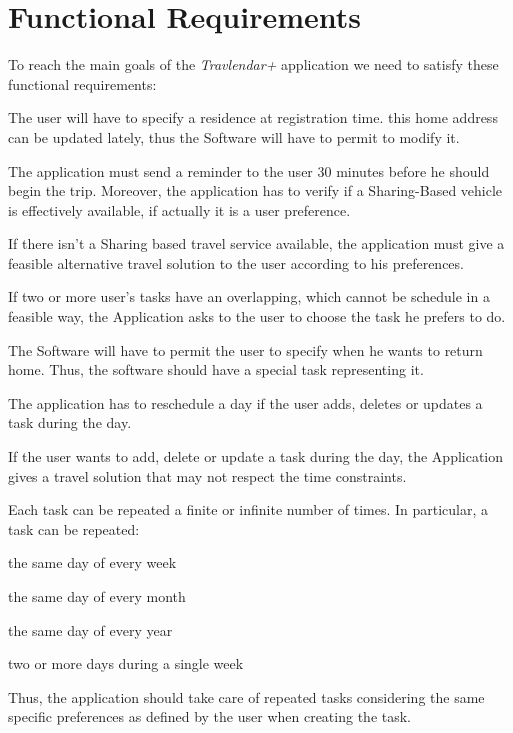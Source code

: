 \newcommand{\tabitem}{~~\llap{\textbullet}~~}

\section{Functional Requirements}
To reach the main goals of the \emph{Travlendar+} application we need to satisfy these functional requirements:

\begin{requirementList}
	\item The user will have to specify a residence at registration time. this home address can be updated lately, thus the Software will have to permit to modify it. 
   
	\item The application must send a reminder to the user 30 minutes before he should begin the trip. Moreover, the application has to verify if a Sharing-Based vehicle is effectively available, if actually it is a user preference.
    
    \item If there isn't a Sharing based travel service available, the application must give a feasible alternative travel solution to the user according to his preferences.
    
    \item If two or more user's tasks have an overlapping, which cannot be schedule in a feasible way, the Application asks to the user to choose the task he prefers to do.
    
    \item The Software will have to permit the user to specify when he wants to return home. Thus, the software should have a special task representing it.
    
    \item The application has to reschedule a day if the user adds, deletes or updates a task during the day.
    
    \item If the user wants to add, delete or update a task during the day, the Application gives a travel solution that may not respect the time constraints.
    
    \item Each task can be repeated a finite or infinite number of times. In particular, a task can be repeated:
    \begin{enumerate}[label={[}R 10.\arabic*{]}:]
    \item the same day of every week
    \item the same day of every month
    \item the same day of every year
    \item two or more days during a single week
    \end{enumerate}
    Thus, the application should take care of repeated tasks considering the same specific preferences as defined by the user when creating the task.
    

\end{requirementList}
